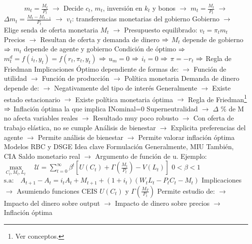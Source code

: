 \documentclass{nuevotema}
\begin{document}
\begin{esquemal}
				\4[] $\quad \quad \quad m_t = \frac{M_t}{P_t}$
				\4[] $\to$ Decide $c_t$, $m_t$, inversión en $k_t$ y bonos
				\4[] $\to$ $m_t = \frac{M_t}{P_t}$
				\4[] $\to$ $\Delta m_t = \frac{M_t - M_{t-1}}{P_t}$
				\4[] $\to$ $v_t$: transferencias monetarias del gobierno
				\4[] Gobierno
				\4[] $\to$ Elige senda de oferta monetaria $M_t$
				\4[] $\to$ Presupuesto equilibrado: $v_t = \pi_t m_t$
				\4[] Precios
				\4[] $\to$ Resultan de oferta y demanda de dinero
				\4[] $\Rightarrow$ $M_t$ depende de gobierno
				\4[] $\Rightarrow$ $m_t$ depende de agente y gobierno
				\4[] Condición de óptimo
				\4[] 
				\4[] $\Rightarrow$ $m_t^d = f(i_t, y_t) = f(r_t, \pi_t, y_t)$
				\4[] $\Rightarrow$ $u_m=0$ $\Rightarrow$ $i_t=0$ $\Rightarrow$ $\pi = -r_t$
				\4[] $\Rightarrow$ Regla de Friedman
			\3 Implicaciones
				\4[] Óptimo dependiente de formas de:
				\4[] $\to$ Función de utilidad
				\4[] $\to$ Función de producción
				\4[] $\to$ Política monetaria
				\4[] Demanda de dinero depende de:
				\4[] $\to$ Negativamente del tipo de interés
				\4[] Generalmente
				\4[] $\to$ Existe estado estacionario
				\4[] $\to$ Existe política monetaria óptima
				\4[] $\to$ Regla de Friedman\footnote{Ver conceptos.}
				\4[] $\Rightarrow$ Inflación óptima la que implica INominal=0
				\4[] Superneutralidad
				\4[] $\to$ $\Delta$ \% de M no afecta variables reales
				\4[] $\to$ Resultado muy poco robusto
				\4[] $\to$ Con oferta de trabajo elástica, no se cumple
				\4[] Análisis de bienestar
				\4[] $\to$ Explicita preferencias del agente
				\4[] $\to$ Permite análisis de bienestar
				\4[] $\to$ Permite valorar inflación óptima
		\2 Modelos RBC y DSGE
			\3 Idea clave
			\3 Formulación
				\4[] Generalmente, MIU
				\4[] También, CIA
				\4[] Saldo monetario real
				\4[] $\to$ Argumento de función de u.
				\4[] Ejemplo:
				\4[] $\underset{C_t, M_t, L_t}{\max} \quad \mathcal{U} = \sum_{t=0}^{\infty} \beta^t \left[ U(C_t) + \Gamma \left( \frac{M_t}{P_t} \right) -V(L_t) \right]$
				\4[] $0 < \beta < 1$
				\4[] $\text{s.a:} \quad A_{t+1} - A_t = i_t A_t + M_{t+1} + (1+i_t)(W_t L_t - P_t C_t - M_t)$
			\3 Implicaciones
				\4[] 
				\4[] $\to$ Asumiendo funciones CEIS $U(C_t)$ y $\Gamma \left( \frac{M_T}{P_t} \right)$
				\4[] Permite estudio de:
				\4[] $\to$ Impacto del dinero sobre output
				\4[] $\to$ Impacto de dinero sobre precios
				\4[] $\to$ Inflación óptima

\end{esquemal}
\end{document}
